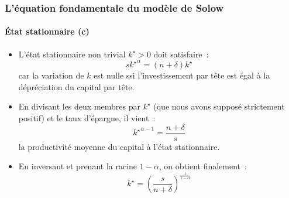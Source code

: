 \documentclass[10pt,notheorems]{beamer}
\theoremstyle{plain}
\theoremstyle{definition} %
\begin{document}
\begin{frame}
  \frametitle{L'équation fondamentale du modèle de Solow}
  \framesubtitle{État stationnaire (c)}

  \bigskip

  \begin{itemize}

  \item L'état stationnaire non trivial $k^{\star}>0$ doit satisfaire~:
    \[
      s \left. k^{\star} \right.^{\alpha} = (n+\delta) k^{\star}
    \]
    car la variation de $k$ est nulle ssi l'investissement par tête
    est égal à la dépréciation du capital par tête.\newline

  \item En divisant les deux membres par $k^{\star}$ (que nous avons supposé strictement positif) et le taux d'épargne, il vient~:
    \[
      \left. k^{\star} \right.^{\alpha-1} = \frac{n+\delta}{s}
    \]
    la productivité moyenne du capital à l'état stationnaire.\newline

  \item En inversant et prenant la racine $1-\alpha$, on obtient finalement~:
    \[
      k^{\star} = \left(\frac{s}{n+\delta}\right)^{\frac{1}{1-\alpha}}
    \]
  \end{itemize}

\end{frame}
\end{document}
